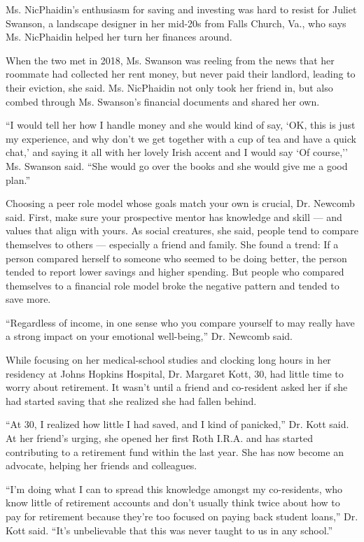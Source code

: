 Ms. NicPhaidin's enthusiasm for saving and investing was hard to resist
for Juliet Swanson, a landscape designer in her mid-20s from Falls
Church, Va., who says Ms. NicPhaidin helped her turn her finances
around.

When the two met in 2018, Ms. Swanson was reeling from the news that her
roommate had collected her rent money, but never paid their landlord,
leading to their eviction, she said. Ms. NicPhaidin not only took her
friend in, but also combed through Ms. Swanson's financial documents and
shared her own.

``I would tell her how I handle money and she would kind of say, `OK,
this is just my experience, and why don't we get together with a cup of
tea and have a quick chat,' and saying it all with her lovely Irish
accent and I would say `Of course,'' Ms. Swanson said. ``She would go
over the books and she would give me a good plan.''

Choosing a peer role model whose goals match your own is crucial, Dr.
Newcomb said. First, make sure your prospective mentor has knowledge and
skill --- and values that align with yours. As social creatures, she
said, people tend to compare themselves to others --- especially a
friend and family. She found a trend: If a person compared herself to
someone who seemed to be doing better, the person tended to report lower
savings and higher spending. But people who compared themselves to a
financial role model broke the negative pattern and tended to save more.

``Regardless of income, in one sense who you compare yourself to may
really have a strong impact on your emotional well-being,'' Dr. Newcomb
said.

While focusing on her medical-school studies and clocking long hours in
her residency at Johns Hopkins Hospital, Dr. Margaret Kott, 30, had
little time to worry about retirement. It wasn't until a friend and
co-resident asked her if she had started saving that she realized she
had fallen behind.

``At 30, I realized how little I had saved, and I kind of panicked,''
Dr. Kott said. At her friend's urging, she opened her first Roth I.R.A.
and has started contributing to a retirement fund within the last year.
She has now become an advocate, helping her friends and colleagues.

``I'm doing what I can to spread this knowledge amongst my co-residents,
who know little of retirement accounts and don't usually think twice
about how to pay for retirement because they're too focused on paying
back student loans,'' Dr. Kott said. ``It's unbelievable that this was
never taught to us in any school.''

